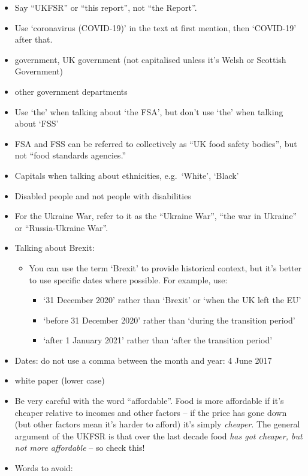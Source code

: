 \documentclass[
]{book}
\providecommand{\tightlist}{%
  \setlength{\itemsep}{0pt}\setlength{\parskip}{0pt}}
\begin{document}
\begin{itemize}
\item
  Say ``UKFSR'' or ``this report'', not ``the Report''.
\item
  Use `coronavirus (COVID-19)' in the text at first mention, then `COVID-19' after that.
\item
  government, UK government (not capitalised unless it's Welsh or Scottish Government)
\item
  other government departments
\item
  Use `the' when talking about `the FSA', but don't use `the' when talking about `FSS'
\item
  FSA and FSS can be referred to collectively as ``UK food safety bodies'', but not ``food standards agencies.''
\item
  Capitals when talking about ethnicities, e.g.~`White', `Black'
\item
  Disabled people and not people with disabilities
\item
  For the Ukraine War, refer to it as the ``Ukraine War'', ``the war in Ukraine'' or ``Russia-Ukraine War''.
\item
  Talking about Brexit:

  \begin{itemize}
  \item
    You can use the term `Brexit' to provide historical context, but it's better to use specific dates where possible. For example, use:

    \begin{itemize}
    \tightlist
    \item
      `31 December 2020' rather than `Brexit' or `when the UK left the EU'
    \item
      `before 31 December 2020' rather than `during the transition period'
    \item
      `after 1 January 2021' rather than `after the transition period'
    \end{itemize}
  \end{itemize}
\item
  Dates: do not use a comma between the month and year: 4 June 2017
\item
  white paper (lower case)
\item
  Be very careful with the word ``affordable''. Food is more affordable if it's cheaper relative to incomes and other factors -- if the price has gone down (but other factors mean it's harder to afford) it's simply \emph{cheaper}. The general argument of the UKFSR is that over the last decade food \emph{has got cheaper, but not more affordable} -- so check this!
\item
  Words to avoid:


\end{itemize}
\end{document}
